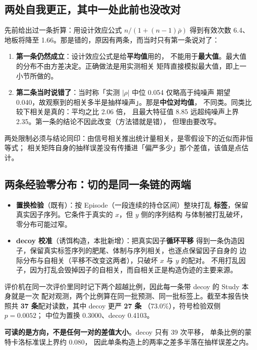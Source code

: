 \documentclass[11pt]{ctexart}
\begin{document}
\subsection{两处自我更正，其中一处此前也没改对}
先前给出过一条折算：用设计效应公式 $n/(1+(n-1)\bar{\rho})$ 得到有效次数 6.4、
地板将降至 1.66。那是错的，原因有两条，而当时只有第一条说对了：

\begin{enumerate}
\item \textbf{第一条仍然成立}：设计效应公式是给\textbf{平均值}用的，
      不能用于\textbf{最大值}。最大值的分布不由方差决定。正确做法是用实测相关
      矩阵直接模拟最大值，即上一小节所做的。
\item \textbf{第二条当时说错了}：当时称「实测 $|\rho|$ 中位 0.054 仅略高于纯噪声
      期望 0.040，故观察到的相关多半是抽样噪声」。那是\textbf{中位对均值}，
      不同类。同类比较下相关是真的：平均之比 2.06 倍，
      且最大特征值 8.85 远超纯噪声上界
      2.35。第一条的结论不因此改变（方法错就是错），
      但理由要改写。
\end{enumerate}

两处限制必须与结论同印：由信号相关推出统计量相关，是零假设下的近似而非恒等式；
相关矩阵自身的抽样误差没有传播进「偏严多少」那个差值，该值是点估计。

\subsection{两条经验零分布：切的是同一条链的两端}
\begin{itemize}
\item \textbf{置换检验}（既有）：按 Episode（一段连续的持仓区间）整块打乱
      \textbf{标签}，保留真实因子序列。它条件于真实的 $x$，但 $y$ 侧的序列结构
      与体制被打乱破坏，零分布可能过窄。
\item \textbf{decoy 校准}（诱饵构造，本批新增）：把真实因子\textbf{循环平移}
      得到一条伪造因子，保留真实标签序列的肥尾、体制与序列相关，也逐点保留因子自身的
      边际分布与自相关（平移不改变这两者），只破坏 $x$ 与 $y$ 的配对。
      不用打乱因子，因为打乱会毁掉因子的自相关，而自相关正是构造伪迹的主要来源。
\end{itemize}

评价机在同一次评价里同时记下两个超越比例，因此每一条带 decoy 的 Study 本身就是一次
配对观测，两个比例算在同一批预测、同一批标签上。截至本报告快照共
\textbf{37 条}配对读数，其中 decoy 更严 \textbf{27 条}
（73.0\%），符号检验双侧 $p=0.0052$；
中位为置换 0.3000、decoy 0.4103。

\textbf{可读的是方向，不是任何一对的差值大小}。decoy 只有 39 次平移，
单条比例的蒙特卡洛标准误上界约 0.080，
因此单条构造上的两率之差多半落在抽样误差之内。
\end{document}
